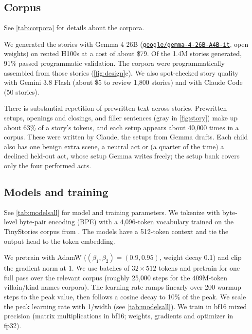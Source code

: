 \subsection{Corpus}
\label{sec:app-corpus}


See \cref{tab:corpora} for details about the corpora.

We generated the stories with Gemma 4 26B (\href{https://huggingface.co/google/gemma-4-26B-A4B-it}{\nolinkurl{google/gemma-4-26B-A4B-it}}, open weights) on rented H100s at a cost of about \$79. Of the 1.4M stories generated, 91\% passed programmatic validation. The corpora were programmatically assembled from those stories (\cref{fig:design}c). We also spot-checked story quality with Gemini 3.8 Flash (about \$5 to review 1{,}800 stories) and with Claude Code (50 stories).

There is substantial repetition of prewritten text across stories. Prewritten setups, openings and closings, and filler sentences (gray in \cref{fig:story}) make up about 63\% of a story's tokens, and each setup appears about 40{,}000 times in a corpus. These were written by Claude, the setups from Gemma drafts. Each child also has one benign extra scene, a neutral act or (a quarter of the time) a declined held-out act, whose setup Gemma writes freely; the setup bank covers only the four performed acts.

\subsection{Models and training}
\label{sec:app-models}

See \cref{tab:modelsall} for model and training parameters.
We tokenize with byte-level byte-pair encoding (BPE) with a 4{,}096-token vocabulary trained on the TinyStories corpus from \citet{eldan2023tinystories}.
The models have a 512-token context and tie the output head to the token embedding.

We pretrain with AdamW ($(\beta_1, \beta_2)=(0.9, 0.95)$, weight decay 0.1) and clip the gradient norm at 1.
We use batches of $32\times 512$ tokens and pretrain for one full pass over the relevant corpus (roughly 25{,}000 steps for the 409M-token villain/kind names corpora).
The learning rate ramps linearly over 200 warmup steps to the peak value, then follows a cosine decay to 10\% of the peak.
We scale the peak learning rate with 1/width (see \cref{tab:modelsall}).
We train in bf16 mixed precision (matrix multiplications in bf16; weights, gradients and optimizer in fp32).

